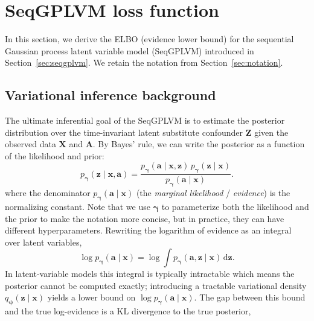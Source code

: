 
\chapter{SeqGPLVM loss function}
\label{sec:seqgplvm_loss}
In this section, we derive the ELBO (evidence lower bound) for the sequential Gaussian process latent variable 
model (SeqGPLVM) introduced in Section~\ref{sec:seqgplvm}. We retain the notation from Section~\ref{sec:notation}.

\section{Variational inference background}
\label{sec:variational_inference_background}
The ultimate inferential goal of the SeqGPLVM is to estimate the posterior distribution over 
the time-invariant latent substitute confounder \(\mathbf{Z}\) given the observed data 
\(\mathbf{X}\) and \(\mathbf{A}\). By Bayes' rule, we can write the posterior as a 
function of the likelihood and prior:
\[
p_{\boldsymbol{\gamma}}(\mathbf{z}\mid \mathbf{x},\mathbf{a})
=
\frac{
p_{\boldsymbol{\gamma}}(\mathbf{a}\mid \mathbf{x},\mathbf{z})\,
p_{\boldsymbol{\gamma}}(\mathbf{z}\mid \mathbf{x})
}{
p_{\boldsymbol{\gamma}}(\mathbf{a}\mid \mathbf{x})
}.
\]
where the denominator
\(
p_{\boldsymbol{\gamma}}(\mathbf{a}\mid \mathbf{x})
\)
(the \emph{marginal likelihood} / \emph{evidence}) is the normalizing constant. Note that 
we use \(\boldsymbol{\gamma}\) to parameterize both the likelihood and the prior to make 
the notation more concise, 
but in practice, they can have different hyperparameters.
Rewriting the logarithm of evidence as an 
integral over latent variables,  
\begin{equation}
\log p_{\boldsymbol{\gamma}}(\mathbf{a}\mid \mathbf{x}) = 
\log \int p_{\boldsymbol{\gamma}}(\mathbf{a},\mathbf{z}\mid \mathbf{x})\,\mathrm{d}\mathbf{z}.
\end{equation}
In latent-variable models this integral is typically intractable which means the 
posterior cannot be computed exactly; introducing a tractable variational density 
\(q_{\boldsymbol{\psi}}(\mathbf{z}\mid \mathbf{x})\) 
yields a lower bound on \(\log p_{\boldsymbol{\gamma}}(\mathbf{a}\mid\mathbf{x})\). 
The gap between this bound and the true log-evidence is a KL divergence to the true posterior, 
